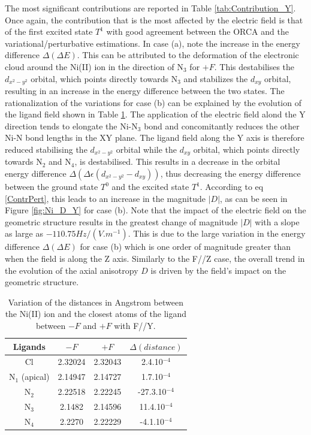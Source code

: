 \documentclass[12pt]{report}
\numberwithin{equation}{section}
\begin{document}
The most significant contributions are reported in Table \ref{tab:Contribution_Y}. 
Once again, the contribution that is the most affected by the electric field is that of the first excited state $T^1$ with good agreement between the ORCA and the variational/perturbative estimations.
In case (a), note the increase in the energy difference $\Delta (\Delta E)$.
This can be attributed to the deformation of the electronic cloud around the Ni(II) ion in the direction of N$_3$ for $+F$. 
This destabilises the $d_{x^2-y^2}$ orbital, which points directly towards N$_3$ and stabilizes the $d_{xy}$ orbital, resulting in an increase in the energy difference between the two states.
The rationalization of the variations for case (b) can be explained by the evolution of the ligand field shown in Table \ref{tab:DistanceY}.
The application of the electric field alond the Y direction tends to elongate the Ni-N$_3$ bond and concomitantly reduces the other Ni-N bond lengths in the XY plane.
The ligand field along the Y axis is therefore reduced stabilising the $d_{x^2-y^2}$ orbital while the $d_{xy}$ orbital, which points directly towards N$_2$ and N$_4$, is destabilised. 
This results in a decrease in the orbital energy difference $\Delta (\Delta \epsilon (d_{x^2-y^2}-d_{xy}))$, thus decreasing the energy difference between the ground state $T^0$ and the excited state $T^1$.
According to eq \ref{ContrPert}, this leads to an increase in the magnitude $|D|$, as can be seen in Figure \ref{fig:Ni_D_Y} for case (b).
Note that the impact of the electric field on the geometric structure results in the greatest change of magnitude $|D|$ with a slope as large as $-110.75 Hz/(V.m^{-1})$.
This is due to the large variation in the energy difference $\Delta (\Delta E)$ for case (b) which is one order of magnitude greater than when the field is along the Z axis.
Similarly to the F//Z case, the overall trend in the evolution of the axial anisotropy $D$ is driven by the field's impact on the geometric structure.


\begin{table}[!ht]
    \centering
    \begin{tabular}{| c | c| c | c |}
        \hline
        Ligands & $-F$ & $+F$ &$\Delta(distance)$\\
        \hline
        Cl & 2.32024& 2.32043&  2.4.10$^{-4}$\\
        N$_1$ (apical) & 2.14947  & 2.14727 &1.7.10$^{-4}$\\
        N$_2$ & 2.22518& 2.22245&-27.3.10$^{-4}$ \\
        N$_3$ & 2.1482& 2.14596&11.4.10$^{-4}$ \\
        N$_4$ & 2.2270& 2.22229 &-4.1.10$^{-4}$\\
        \hline
    \end{tabular}
    \caption{Variation of the distances in Angstrom between the Ni(II) ion and the closest atoms of the ligand between $-F$ and $+F$ with F//Y.}
    \label{tab:DistanceY}
\end{table}
\end{document}

